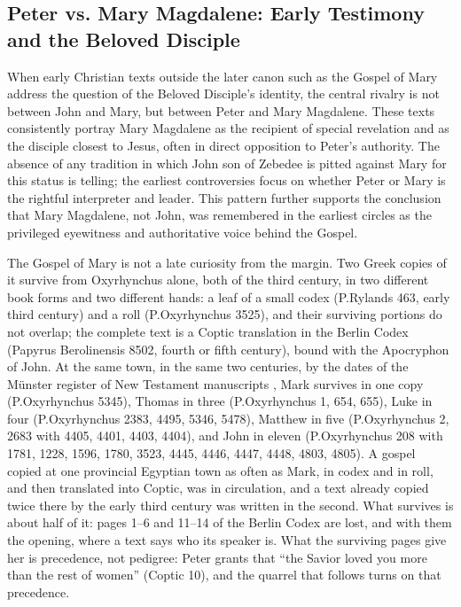 \subsection{Peter vs. Mary Magdalene: Early Testimony and the Beloved Disciple}\label{subsec:peter-vs-mary-magdalene-early-testimony}

When early Christian texts outside the later canon such as the Gospel of Mary address the question of the Beloved Disciple's identity, the central rivalry is not between John and Mary, but between Peter and Mary Magdalene. These texts consistently portray Mary Magdalene as the recipient of special revelation and as the disciple closest to Jesus, often in direct opposition to Peter's authority. The absence of any tradition in which John son of Zebedee is pitted against Mary for this status is telling; the earliest controversies focus on whether Peter or Mary is the rightful interpreter and leader. This pattern further supports the conclusion that Mary Magdalene, not John, was remembered in the earliest circles as the privileged eyewitness and authoritative voice behind the Gospel.

The Gospel of Mary is not a late curiosity from the margin.
Two Greek copies of it survive from Oxyrhynchus alone, both of the third century, in two different book forms and two different hands: a leaf of a small codex (P.Rylands 463, early third century) and a roll (P.Oxyrhynchus 3525), and their surviving portions do not overlap; the complete text is a Coptic translation in the Berlin Codex (Papyrus Berolinensis 8502, fourth or fifth century), bound with the Apocryphon of John.
At the same town, in the same two centuries, by the dates of the Münster register of New Testament manuscripts \cite{intf:liste}, Mark survives in one copy (P.Oxyrhynchus 5345), Thomas in three (P.Oxyrhynchus 1, 654, 655), Luke in four (P.Oxyrhynchus 2383, 4495, 5346, 5478), Matthew in five (P.Oxyrhynchus 2, 2683 with 4405, 4401, 4403, 4404), and John in eleven (P.Oxyrhynchus 208 with 1781, 1228, 1596, 1780, 3523, 4445, 4446, 4447, 4448, 4803, 4805).
A gospel copied at one provincial Egyptian town as often as Mark, in codex and in roll, and then translated into Coptic, was in circulation, and a text already copied twice there by the early third century was written in the second.
What survives is about half of it: pages 1--6 and 11--14 of the Berlin Codex are lost, and with them the opening, where a text says who its speaker is.
What the surviving pages give her is precedence, not pedigree: Peter grants that ``the Savior loved you more than the rest of women'' (Coptic 10), and the quarrel that follows turns on that precedence.

